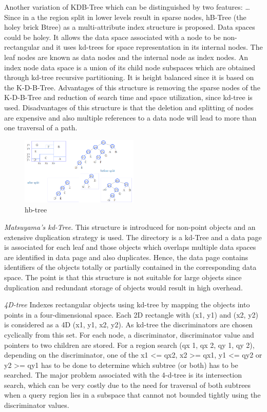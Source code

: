 \documentclass[a4paper,12pt]{article}
\begin{document}
Another variation of KDB-Tree which can be distinguished by two features: …
Since in a the region split in lower levels result in sparse nodes, hB-Tree (the holey brick Btree) as a multi-attribute index structure is proposed. Data spaces could be holey. It allows the data space associated with a node to be non-rectangular and it uses kd-trees for space representation in its internal nodes. The leaf nodes are known as data nodes and the internal node as index nodes. An index node data space is a union of its child node subspaces which are obtained through kd-tree recursive partitioning. It is height balanced since it is based on the K-D-B-Tree. 
Advantages of this structure is removing the sparse nodes of the K-D-B-Tree and reduction of search time and space utilization, since kd-tree is used. 
Disadvantages of this structure is that the deletion and splitting of nodes are expensive and also multiple references to a data node will lead to more than one traversal of a path.

\begin{figure}
\centering
\includegraphics[width=0.5\textwidth]{hbtree}
\caption{hb-tree}
\label{fighbtree}
\end{figure}

\emph{Matsuyama’s kd-Tree}.
This structure is introduced for non-point objects and an extensive duplication strategy is used. The directory is a kd-Tree and a data page is associated for each leaf and those objects which overlaps multiple data spaces are identified in data page and also duplicates. Hence, the data page contains identifiers of the objects totally or partially contained in the corresponding data space.
The point is that this structure is not suitable for large objects since duplication and redundant storage of objects would result in high overhead.

\emph{4D-tree}
Indexes rectangular objects using kd-tree by mapping the objects into points in a four-dimensional space. Each 2D rectangle with (x1, y1) and (x2, y2) is considered as a 4D (x1, y1, x2, y2). As kd-tree the discriminators are chosen cyclically from this set. For each node, a discriminator, discriminator value and pointers to two children are stored. 
For a region search (qx 1, qx 2, qy 1, qy 2), depending on the discriminator, one of the x1 <= qx2, x2  >=  qx1, y1 <= qy2 or y2 >= qy1 has to be done to determine which subtree (or both) has to be searched.
The major problem associated with the 4-d-tree is its intersection search, which can be very costly due to the need for traversal of both subtrees when a query region lies in a subspace that cannot not bounded tightly using the discriminator values.
\end{document}
